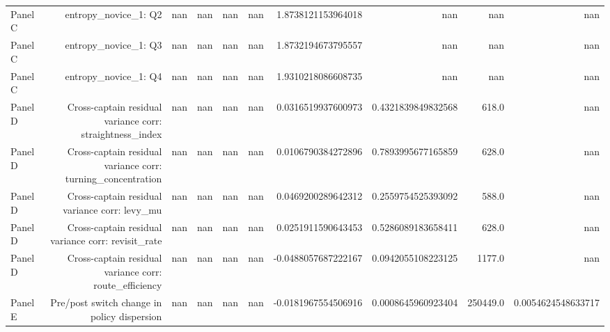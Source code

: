 \documentclass{article}
\begin{document}
\begin{tabular}{lrrrrrrrrr}
Panel C & entropy\_novice\_1: Q2 & nan & nan & nan & nan & 1.8738121153964018 & nan & nan & nan \\
Panel C & entropy\_novice\_1: Q3 & nan & nan & nan & nan & 1.8732194673795557 & nan & nan & nan \\
Panel C & entropy\_novice\_1: Q4 & nan & nan & nan & nan & 1.9310218086608735 & nan & nan & nan \\
Panel D & Cross-captain residual variance corr: straightness\_index & nan & nan & nan & nan & 0.0316519937600973 & 0.4321839849832568 & 618.0 & nan \\
Panel D & Cross-captain residual variance corr: turning\_concentration & nan & nan & nan & nan & 0.0106790384272896 & 0.7893995677165859 & 628.0 & nan \\
Panel D & Cross-captain residual variance corr: levy\_mu & nan & nan & nan & nan & 0.0469200289642312 & 0.2559754525393092 & 588.0 & nan \\
Panel D & Cross-captain residual variance corr: revisit\_rate & nan & nan & nan & nan & 0.0251911590643453 & 0.5286089183658411 & 628.0 & nan \\
Panel D & Cross-captain residual variance corr: route\_efficiency & nan & nan & nan & nan & -0.0488057687222167 & 0.0942055108223125 & 1177.0 & nan \\
Panel E & Pre/post switch change in policy dispersion & nan & nan & nan & nan & -0.0181967554506916 & 0.0008645960923404 & 250449.0 & 0.0054624548633717 \\
\hline
\end{tabular}
\end{document}
